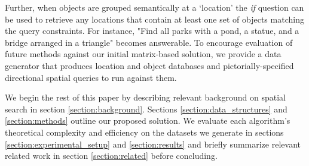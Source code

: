 Further, when objects are grouped semantically at a `location' the \emph{if} question can be used to retrieve any locations that contain at least one set of objects matching the query constraints.
For instance, "Find all parks with a pond, a statue, and a bridge arranged in a triangle" becomes answerable.
To encourage evaluation of future methods against our initial matrix-based solution, we provide a data generator that produces location and object databases and pictorially-specified directional spatial queries to run against them.

We begin the rest of this paper by describing relevant background on spatial search in section \ref{section:background}. Sections \ref{section:data_structures} and \ref{section:methods} outline our proposed solution. We evaluate each algorithm's theoretical complexity and efficiency on the datasets we generate in sections \ref{section:experimental_setup} and \ref{section:results} and briefly summarize relevant related work in section \ref{section:related} before concluding.
